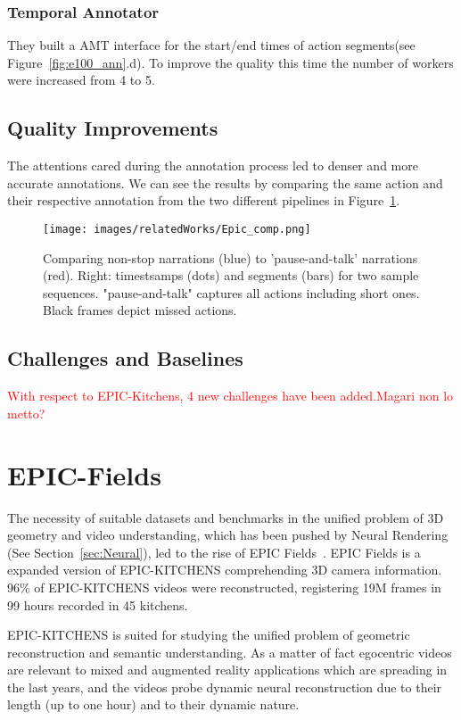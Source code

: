 \subsubsection{Temporal Annotator}
They built a AMT interface for the start/end times of action segments(see Figure~\ref{fig:e100_ann}.d).
To improve the quality this time the number of workers were increased from 4 to 5.

\subsection{Quality Improvements}
The attentions cared during the annotation process led to denser and more accurate annotations.
We can see the results by comparing the same action and their respective annotation from the
two different pipelines in Figure~\ref{fig:ep100_comp}.

\begin{figure}
    \centering
    \texttt{[image: images/relatedWorks/Epic\_comp.png]} 
    \caption{Comparing non-stop narrations (blue) to 'pause-and-talk' narrations (red).
    Right: timestsamps (dots) and segments (bars) for two sample sequences. "pause-and-talk"
    captures all actions including short ones. Black frames depict missed actions.}\label{fig:ep100_comp}
\end{figure}

\subsection{Challenges and Baselines}
\textcolor{red}{With respect to EPIC-Kitchens, 4 new challenges have 
been added.Magari non lo metto? }

\section{EPIC-Fields}
The necessity of suitable datasets and benchmarks in the unified problem of 3D geometry and video understanding, which has been
pushed by Neural Rendering (See Section~\ref{sec:Neural}), led to the rise of EPIC Fields~\cite{epic_fields}. EPIC Fields is a expanded version of 
EPIC-KITCHENS comprehending 3D camera information. 96\% of EPIC-KITCHENS videos were reconstructed, registering 19M frames in 
99 hours recorded in 45 kitchens.

EPIC-KITCHENS is suited for studying the unified problem of geometric reconstruction and semantic understanding. As a matter
of fact egocentric videos  are relevant to mixed and augmented reality applications which are spreading in the last years, and 
the videos probe dynamic neural reconstruction due to their length (up to one hour) and to their dynamic nature.

